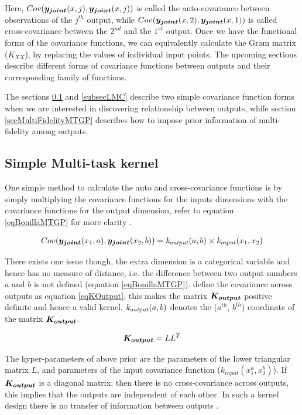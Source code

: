 Here, $Cov(\boldsymbol{y_{joint}}(x, j), \boldsymbol{y_{joint}}(x, j))$ is called the  auto-covariance between observations of the $j^{th}$ output, while $Cov(\boldsymbol{y_{joint}}(x, 2), \boldsymbol{y_{joint}}(x, 1))$ is called cross-covariance between the $2^{nd}$ and the $1^{st}$ output. Once we have the functional forms of the covariance functions, we can equivalently calculate the Gram matrix ($K_{XX}$), by replacing the values of individual input points. The upcoming sections describe different forms of covariance functions between outputs and their corresponding family of functions.

The sections \ref{simpleMultiTask} and \ref{subsecLMC} describe two simple covariance function forms when we are interested in discovering relationship between outputs, while section \ref{secMultiFidelityMTGP} describes how to impose prior information of multi-fidelity among outputs. 

\subsection{Simple Multi-task kernel}\label{simpleMultiTask}

One simple method to calculate the auto and cross-covariance functions is by simply multiplying the covariance functions for the inputs dimensions with the covariance functions for the output dimension, refer to equation \ref{eqBonillaMTGP} for more clarity \cite{bonilla2007multi}.   

\begin{align}\label{eqBonillaMTGP}
    Cov(\boldsymbol{y_{joint}}(x_{1}, a), \boldsymbol{y_{joint}}(x_{2}, b)) = \mathit{k_{output}}(a, b) \times \mathit{k_{input}}(x_{1}, x_{2})
\end{align}

There exists one issue though, the extra dimension is a categorical variable and hence has no measure of distance, i.e. the difference between two output numbers $a$ and $b$ is not defined (equation \ref{eqBonillaMTGP}). \cite{bonilla2007multi} define the covariance across outputs as equation \ref{eqKOutput}, this makes the matrix $\boldsymbol{K_{output}}$ positive definite and hence a valid kernel. $\mathit{k_{output}}(a, b)$ denotes the ($a^{th}$, $b^{th}$) coordinate of the matrix $\boldsymbol{K_{output}}$.

\begin{equation}\label{eqKOutput}
\boldsymbol{K_{output}} = LL^T
\end{equation}

The hyper-parameters of above prior are the parameters of the lower triangular matrix $L$, and parameters of the input  covariance function ($k_{input}(x_{1}^{a}, x_{2}^{b})$). If $\boldsymbol{K_{output}}$ is a diagonal matrix, then there is no cross-covariance across outputs, this implies that the outputs are independent of each other. In such a kernel design there is no transfer of information between outputs \cite{bonilla2007multi, o1998markov}.

